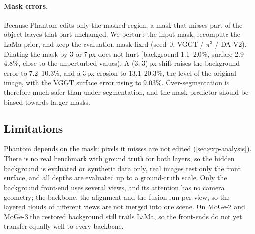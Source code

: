 \paragraph{Mask errors.}
Because Phantom edits only the masked region, a mask that misses part of the object leaves that part unchanged.
We perturb the input mask, recompute the LaMa prior, and keep the evaluation mask fixed (seed~0, VGGT / $\pi^3$ / DA-V2).
Dilating the mask by 3 or 7\,px does not hurt (background 1.1--2.0\%, surface 2.9--4.8\%, close to the unperturbed values).
A (3, 3)\,px shift raises the background error to 7.2--10.3\%, and a 3\,px erosion to 13.1--20.3\%, the level of the original image, with the VGGT surface error rising to 9.03\%.
Over-segmentation is therefore much safer than under-segmentation, and the mask predictor should be biased towards larger masks.

\subsection{Limitations}
\label{sec:exp-limitations}

Phantom depends on the mask: pixels it misses are not edited (\cref{sec:exp-analysis}).
There is no real benchmark with ground truth for both layers, so the hidden background is evaluated on synthetic data only, real images test only the front surface, and all depths are evaluated up to a ground-truth scale.
Only the background front-end uses several views, and its attention has no camera geometry; the backbone, the alignment and the fusion run per view, so the layered clouds of different views are not merged into one scene.
On MoGe-2 and MoGe-3 the restored background still trails LaMa, so the front-ends do not yet transfer equally well to every backbone.
